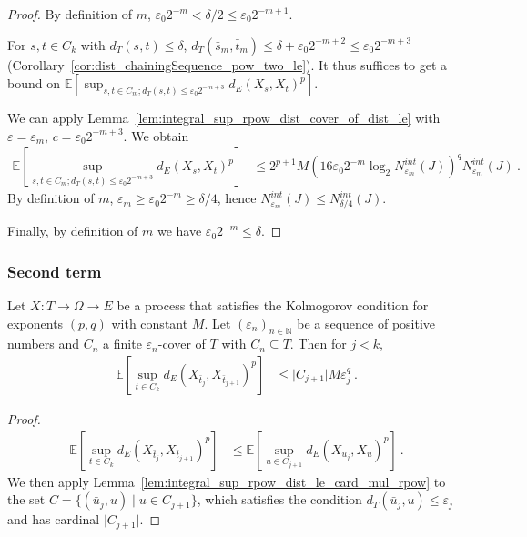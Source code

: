 \begin{proof}\leanok
By definition of $m$, $\varepsilon_0 2^{-m} < \delta/2 \le \varepsilon_0 2^{-m+1}$.

For $s, t \in C_k$ with $d_T(s, t) \le \delta$, $d_T(\bar{s}_m, \bar{t}_m) \le \delta + \varepsilon_0 2^{-m+2} \le \varepsilon_0 2^{-m+3}$ (Corollary~\ref{cor:dist_chainingSequence_pow_two_le}).
It thus suffices to get a bound on $\mathbb{E} \left[ \sup_{s, t \in C_m; d_T(s, t) \le \varepsilon_0 2^{-m+3}} d_E(X_s, X_t)^p \right]$.

We can apply Lemma~\ref{lem:integral_sup_rpow_dist_cover_of_dist_le} with $\varepsilon = \varepsilon_m$, $c = \varepsilon_0 2^{-m+3}$. We obtain
\begin{align*}
  \mathbb{E} \left[ \sup_{s, t \in C_m; d_T(s, t) \le \varepsilon_0 2^{-m+3}} d_E(X_s, X_t)^p \right]
  &\le 2^{p+1} M \left(16 \varepsilon_0 2^{-m} \log_2 N^{int}_{\varepsilon_m}(J) \right)^q  N^{int}_{\varepsilon_m}(J)
  \: .
\end{align*}
By definition of $m$, $\varepsilon_m \ge \varepsilon_0 2^{-m} \ge \delta/4$,
hence $N^{int}_{\varepsilon_m}(J) \le N^{int}_{\delta / 4}(J)$.

Finally, by definition of $m$ we have $\varepsilon_0 2^{-m} \le \delta$.
\end{proof}



\subsubsection{Second term}


\begin{lemma}\label{lem:integral_sup_rpow_dist_succ}
  \leanok
Let $X : T \to \Omega \to E$ be a process that satisfies the Kolmogorov condition for exponents $(p,q)$ with constant $M$.
Let $(\varepsilon_n)_{n \in \mathbb{N}}$ be a sequence of positive numbers and $C_n$ a finite $\varepsilon_n$-cover of $T$ with $C_n \subseteq T$.
Then for $j < k$,
\begin{align*}
  \mathbb{E}\left[\sup_{t \in C_k} d_E(X_{\bar{t}_j}, X_{\bar{t}_{j+1}})^p \right]
  &\le \vert C_{j+1} \vert M \varepsilon_j^q
  \: .
\end{align*}
\end{lemma}

\begin{proof}\leanok
\begin{align*}
  \mathbb{E}\left[\sup_{t \in C_k} d_E(X_{\bar{t}_j}, X_{\bar{t}_{j+1}})^p \right]
  &\le \mathbb{E}\left[\sup_{u \in C_{j+1}} d_E(X_{\bar{u}_j}, X_{u})^p \right]
  \: .
\end{align*}
We then apply Lemma~\ref{lem:integral_sup_rpow_dist_le_card_mul_rpow} to the set $C = \{(\bar{u}_j, u) \mid u \in C_{j+1}\}$, which satisfies the condition $d_T(\bar{u}_j, u) \le \varepsilon_j$ and has cardinal $\vert C_{j+1} \vert$.
\end{proof}




